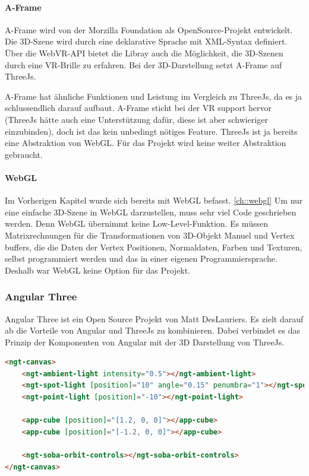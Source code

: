 \paragraph{A-Frame}
A-Frame wird von der Morzilla Foundation als OpenSource-Projekt entwickelt. Die 3D-Szene wird durch eine deklarative Sprache mit XML-Syntax definiert. Über die WebVR-API bietet die Libray auch die Möglichkeit, die 3D-Szenen durch eine VR-Brille zu erfahren. Bei der 3D-Darstellung setzt A-Frame auf ThreeJs. \cite[A-Frame Wikipedia]{a-frame-wiki}

A-Frame hat ähnliche Funktionen und Leistung im Vergleich zu ThreeJs, da es ja schlussendlich darauf aufbaut. A-Frame sticht bei der VR support hervor (ThreeJs hätte auch eine Unterstützung dafür, diese ist aber schwieriger einzubinden), doch ist das kein unbedingt nötiges Feature. ThreeJs ist ja bereits eine Abstraktion von WebGL. Für das Projekt wird keine weiter Abstraktion gebraucht.

\paragraph{WebGL}
Im Vorherigen Kapitel wurde sich bereits mit WebGL befasst. \ref{ch::webgl}
Um nur eine einfache 3D-Szene in WebGL darzustellen, muss sehr viel Code geschrieben werden. Denn WebGL übernimmt keine Low-Level-Funktion. Es müssen Matrixrechnungen für die Transformationen von 3D-Objekt Manuel und Vertex buffers, die die Daten der Vertex Positionen, Normaldaten, Farben und Texturen, selbst programmiert werden und das in einer eigenen Programmiersprache. Deshalb war WebGL keine Option für das Projekt.

\subsubsection{Angular Three}
Angular Three ist ein Open Source Projekt von Matt DesLauriers. Es zielt darauf ab die Vorteile von Angular und ThreeJs zu kombinieren. Dabei verbindet es das Prinzip der Komponenten von Angular mit der 3D Darstellung von ThreeJs. 

\begin{lstlisting}[language=html,caption=Angular Three - Komponentenbasiertes 3D Scenen in HTML,label=lst:impl:AngularThreeExampleCode]
<ngt-canvas>
    <ngt-ambient-light intensity="0.5"></ngt-ambient-light>
    <ngt-spot-light [position]="10" angle="0.15" penumbra="1"></ngt-spot-light>
    <ngt-point-light [position]="-10"></ngt-point-light>
  
    <app-cube [position]="[1.2, 0, 0]"></app-cube>
    <app-cube [position]="[-1.2, 0, 0]"></app-cube>
  
    <ngt-soba-orbit-controls></ngt-soba-orbit-controls>
</ngt-canvas>
\end{lstlisting}

